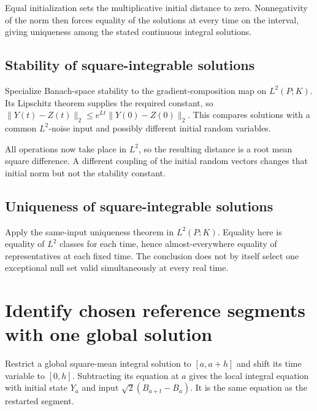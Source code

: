 \documentclass[11pt,a4paper]{report}
\begin{document}
Equal initialization sets the multiplicative initial distance to zero. Nonnegativity of the norm then forces equality of the solutions at every time on the interval, giving uniqueness among the stated continuous integral solutions.

\subsection{\texorpdfstring{Stability of square-integrable solutions}{Stability of square-integrable solutions}}
\label{report-step-UnadjustedLangevin-LangevinUniqueness-lean-3}


Specialize Banach-space stability to the gradient-composition map on \(L^2(P;K)\). Its Lipschitz theorem supplies the required constant, so \(\|Y(t)-Z(t)\|_2\le e^{Lt}\|Y(0)-Z(0)\|_2\). This compares solutions with a common \(L^2\)-noise input and possibly different initial random variables.



All operations now take place in \(L^2\), so the resulting distance is a root mean square difference. A different coupling of the initial random vectors changes that initial norm but not the stability constant.

\subsection{\texorpdfstring{Uniqueness of square-integrable solutions}{Uniqueness of square-integrable solutions}}
\label{report-step-UnadjustedLangevin-LangevinUniqueness-lean-4}


Apply the same-input uniqueness theorem in \(L^2(P;K)\). Equality here is equality of \(L^2\) classes for each time, hence almost-everywhere equality of representatives at each fixed time. The conclusion does not by itself select one exceptional null set valid simultaneously at every real time.

\section{\texorpdfstring{Identify chosen reference segments with one global solution}{Identify chosen reference segments with one global solution}}
\label{proof-module-UnadjustedLangevin-BrownianSegmentsGlobal-lean}


Restrict a global square-mean integral solution to \([a,a+h]\) and shift its time variable to \([0,h]\). Subtracting its equation at \(a\) gives the local integral equation with initial state \(Y_a\) and input \(\sqrt2(B_{a+t}-B_a)\). It is the same equation as the restarted segment.
\end{document}
